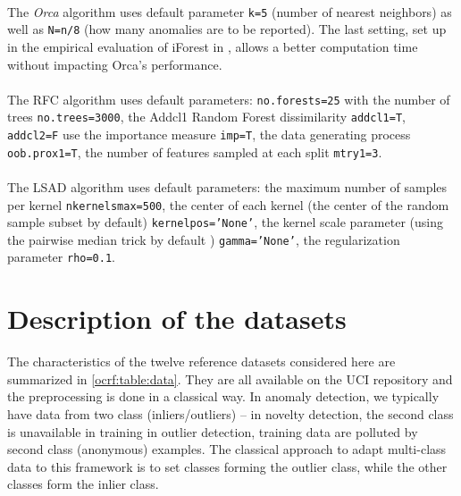 \paragraph{}
The \emph{Orca} algorithm uses default parameter \texttt{k=5} (number of
nearest neighbors) as well as \texttt{N=n/8} (how many anomalies are to be
reported).  The last setting, set up in the empirical evaluation of iForest in
\citet{Liu2012}, allows a better computation time without impacting Orca's
performance.
\paragraph{}
The \ac{RFC} algorithm uses default parameters: \texttt{no.forests=25} with the
number of trees \texttt{no.trees=3000}, the Addcl1 Random Forest dissimilarity
\texttt{addcl1=T}, \texttt{addcl2=F} use the importance measure \texttt{imp=T},
the data generating process \texttt{oob.prox1=T}, the number of features
sampled at each split \texttt{mtry1=3}.
\paragraph{}
The \ac{LSAD} algorithm uses default parameters: the maximum number of samples
per kernel \texttt{n\textunderscore kernels\textunderscore max=500}, the center
of each kernel (the center of the random sample subset by default)
\texttt{kernel\textunderscore pos='None'}, the kernel scale parameter (using
the pairwise median trick by default \citep{jaakkola1999using})
\texttt{gamma='None'}, the regularization parameter \texttt{rho=0.1}.

\section{Description of the datasets}
\label{supp:dataset_description}
%
The characteristics of the twelve reference datasets considered here are
summarized in \cref{ocrf:table:data}. They are all available on the \acs{UCI}
repository \citep{Lichman2013} and the preprocessing is done in a classical
way.
In anomaly detection, we typically have data from two class (inliers/outliers)
-- in novelty detection, the second class is unavailable in training in outlier
detection, training data are polluted by second class (anonymous) examples. The
classical approach to adapt multi-class data to this framework is to set
classes forming the outlier class, while the other classes form the inlier
class.
